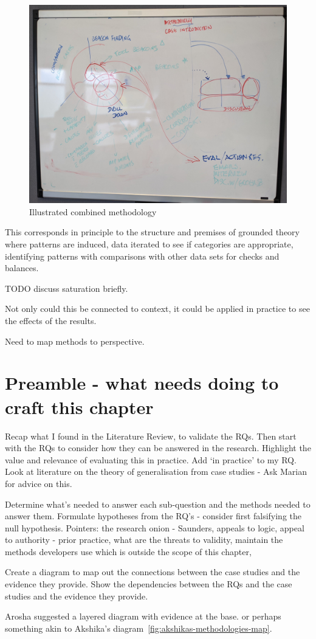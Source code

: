 \begin{figure}
    \centering
    \includegraphics[width=14cm]{images/my/illustrated-combined-methodology-v0-1.jpg}
    \caption{Illustrated combined methodology}
    \label{fig:illustrated-combined-methodology}
\end{figure}

This corresponds in principle to the structure and premises of grounded theory where patterns are induced, data iterated to see if categories are appropriate, identifying patterns with comparisons with other data sets for checks and balances. 

TODO discuss saturation briefly. 

Not only could this be connected to context, it could be applied in practice to see the effects of the results.

Need to map methods to perspective. 


\section*{Preamble - what needs doing to craft this chapter}
{\small
Recap what I found in the Literature Review, to validate the RQs. Then start with the RQs to consider how they can be answered in the research. Highlight the value and relevance of evaluating this in practice. Add `in practice' to my RQ. Look at literature on the theory of generalisation from case studies - Ask Marian for advice on this.

Determine what's needed to answer each sub-question and the methods needed to answer them. Formulate hypotheses from the RQ's - consider first falsifying the null hypothesis. Pointers: the research onion - Saunders, appeals to logic, appeal to authority - prior practice, what are the threats to validity, maintain the methods developers use which is outside the scope of this chapter,

Create a diagram to map out the connections between the case studies and the evidence they provide. Show the dependencies between the RQs and the case studies and the evidence they provide.

Arosha suggested a layered diagram with evidence at the base. or perhaps something akin to Akshika's diagram~\ref{fig:akshikas-methodologies-map}.
}

